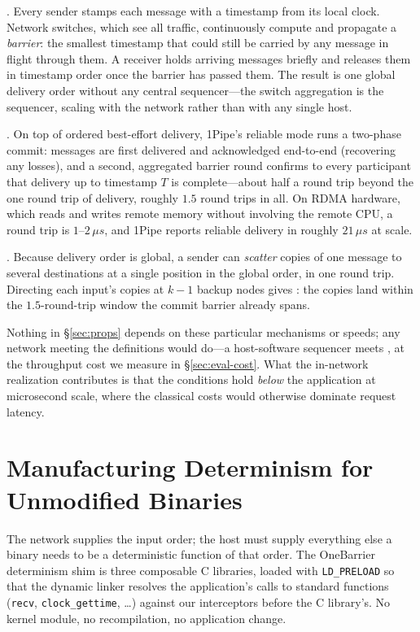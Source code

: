 \Order. Every sender stamps each message with a timestamp from
its local clock. Network switches, which see all traffic, continuously
compute and propagate a \emph{barrier}: the smallest timestamp that could
still be carried by any message in flight through them. A receiver holds
arriving messages briefly and releases them in timestamp order once the
barrier has passed them. The result is one global delivery order without
any central sequencer---the switch aggregation is the sequencer, scaling
with the network rather than with any single host.

\Barrier. On top of ordered best-effort delivery, 1Pipe's
reliable mode runs a two-phase commit: messages are first delivered and
acknowledged end-to-end (recovering any losses), and a second, aggregated
barrier round confirms to every participant that delivery up to timestamp
$T$ is complete---about half a round trip beyond the one round trip of
delivery, roughly $1.5$ round trips in all. On RDMA hardware, which reads
and writes remote memory without involving the remote CPU, a round trip is
$1$--$2\,\mu s$, and 1Pipe reports reliable delivery in roughly
$21\,\mu s$ at scale.

\Durability. Because delivery order is global, a sender can
\emph{scatter} copies of one message to several destinations at a single
position in the global order, in one round trip. Directing each input's
copies at $k-1$ backup nodes gives \Durability: the copies land within the
$1.5$-round-trip window the commit barrier already spans.

Nothing in \S\ref{sec:props} depends on these particular mechanisms or
speeds; any network meeting the definitions would do---a host-software
sequencer meets \Order, at the throughput cost we measure in
\S\ref{sec:eval-cost}. What the in-network realization contributes is that
the conditions hold \emph{below} the application at microsecond scale,
where the classical costs would otherwise dominate request latency.

\section{Manufacturing Determinism for Unmodified Binaries}
\label{sec:libos}

The network supplies the input order; the host must supply everything else
a binary needs to be a deterministic function of that order. The OneBarrier
determinism shim is three composable C libraries, loaded with
\texttt{LD\_PRELOAD} so that the dynamic linker resolves
the application's calls to standard functions (\texttt{recv},
\texttt{clock\_gettime}, \dots) against our interceptors before the C
library's. No kernel module, no recompilation, no application change.

